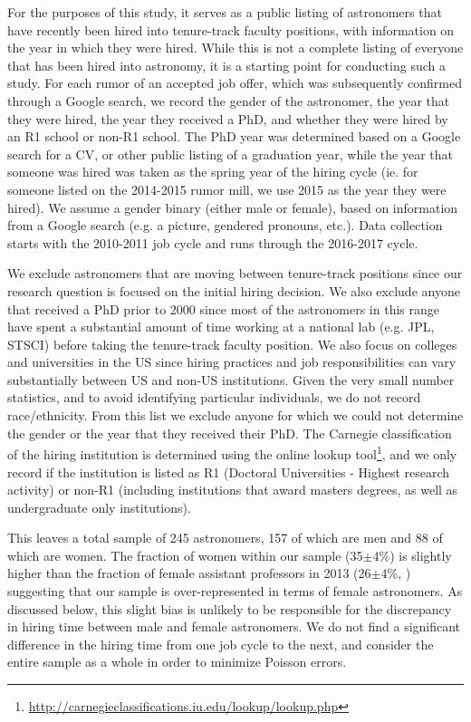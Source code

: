 \documentclass[modern]{aastex62}
\begin{document}
For the purposes of this study, it serves as a public listing of astronomers that have recently been hired into tenure-track faculty positions, with information on the year in which they were hired. While this is not a complete listing of everyone that has been hired into astronomy, it is a starting point for conducting such a study. For each rumor of an accepted job offer, which was subsequently confirmed through a Google search, we record the gender of the astronomer, the year that they were hired, the year they received a PhD, and whether they were hired by an R1 school or non-R1 school. The PhD year was determined based on a Google search for a CV, or other public listing of a graduation year, while the year that someone was hired was taken as the spring year of the hiring cycle (ie. for someone listed on the 2014-2015 rumor mill, we use 2015 as the year they were hired). We assume a gender binary (either male or female), based on information from a Google search (e.g. a picture, gendered pronouns, etc.). Data collection starts with the 2010-2011 job cycle and runs through the 2016-2017 cycle. 

We exclude astronomers that are moving between tenure-track positions since our research question is focused on the initial hiring decision. We also exclude anyone that received a PhD prior to 2000 since most of the astronomers in this range have spent a substantial amount of time working at a national lab (e.g. JPL, STSCI) before taking the tenure-track faculty position. We also focus on colleges and universities in the US since hiring practices and job responsibilities can vary substantially between US and non-US institutions. Given the very small number statistics, and to avoid identifying particular individuals, we do not record race/ethnicity. From this list we exclude anyone for which we could not determine the gender or the year that they received their PhD. The Carnegie classification of the hiring institution is determined using the online lookup tool\footnote{\url{http://carnegieclassifications.iu.edu/lookup/lookup.php}}, and we only record if the institution is listed as R1 (Doctoral Universities - Highest research activity) or non-R1 (including institutions that award masters degrees, as well as undergraduate only institutions). 

This leaves a total sample of 245 astronomers, 157 of which are men and 88 of which are women. The fraction of women within our sample (35$\pm$4\%) is slightly higher than the fraction of female assistant professors in 2013 (26$\pm$4\%, \citet{hug14}) suggesting that our sample is over-represented in terms of female astronomers. As discussed below, this slight bias is unlikely to be responsible for the  discrepancy in hiring time between male and female astronomers. We do not find a significant difference in the hiring time from one job cycle to the next, and consider the entire sample as a whole in order to minimize Poisson errors. 
\end{document}
